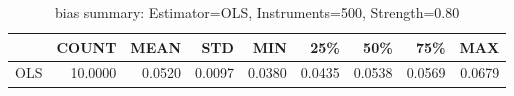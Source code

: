 \begin{table}[ht]
\centering
\caption{bias summary: Estimator=OLS, Instruments=500, Strength=0.80}
\begin{tabular}{lrrrrrrrr}
\toprule
 & COUNT & MEAN & STD & MIN & 25\% & 50\% & 75\% & MAX \\
\midrule
OLS & 10.0000 & 0.0520 & 0.0097 & 0.0380 & 0.0435 & 0.0538 & 0.0569 & 0.0679 \\
\bottomrule
\end{tabular}
\end{table}
